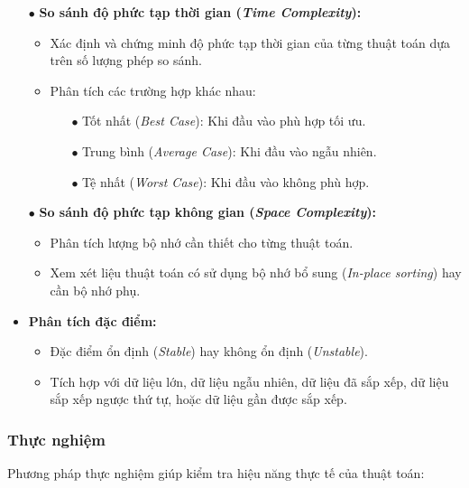 \begin{itemize}
    \item[$\bullet$] \textbf{So sánh độ phức tạp thời gian (\textit{Time Complexity}):}
    \begin{itemize}
        \item Xác định và chứng minh độ phức tạp thời gian của từng thuật toán dựa trên số lượng phép so sánh.
        \item Phân tích các trường hợp khác nhau:
        \begin{itemize}
            \item[$\bullet$] Tốt nhất (\textit{Best Case}): Khi đầu vào phù hợp tối ưu.
            \item[$\bullet$] Trung bình (\textit{Average Case}): Khi đầu vào ngẫu nhiên.
            \item[$\bullet$] Tệ nhất (\textit{Worst Case}): Khi đầu vào không phù hợp.
        \end{itemize}
    \end{itemize}
    
    \item[$\bullet$] \textbf{So sánh độ phức tạp không gian (\textit{Space Complexity}):}
    \begin{itemize}
        \item Phân tích lượng bộ nhớ cần thiết cho từng thuật toán.
        \item Xem xét liệu thuật toán có sử dụng bộ nhớ bổ sung (\textit{In-place sorting}) hay cần bộ nhớ phụ.
    \end{itemize}
    
    \item \textbf{Phân tích đặc điểm:}
    \begin{itemize}
        \item Đặc điểm ổn định (\textit{Stable}) hay không ổn định (\textit{Unstable}).
        \item Tích hợp với dữ liệu lớn, dữ liệu ngẫu nhiên, dữ liệu đã sắp xếp, dữ liệu sắp xếp ngược thứ tự, hoặc dữ liệu gần được sắp xếp.
    \end{itemize}
\end{itemize}

\subsubsection{Thực nghiệm}
Phương pháp thực nghiệm giúp kiểm tra hiệu năng thực tế của thuật toán:

